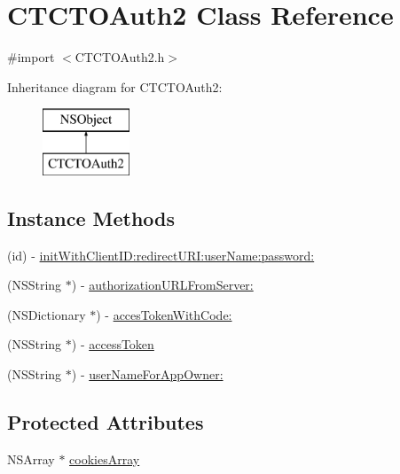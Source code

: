 \hypertarget{interface_c_t_c_t_o_auth2}{\section{C\-T\-C\-T\-O\-Auth2 Class Reference}
\label{interface_c_t_c_t_o_auth2}
}


{\ttfamily \#import $<$C\-T\-C\-T\-O\-Auth2.\-h$>$}

Inheritance diagram for C\-T\-C\-T\-O\-Auth2\-:\begin{figure}[H]
\begin{center}
\leavevmode
\includegraphics[height=2.000000cm]{interface_c_t_c_t_o_auth2}
\end{center}
\end{figure}
\subsection*{Instance Methods}
\begin{DoxyCompactItemize}
\item 
(id) -\/ \hyperlink{interface_c_t_c_t_o_auth2_a1a64c838f79fef55b95e8188231a7170}{init\-With\-Client\-I\-D\-:redirect\-U\-R\-I\-:user\-Name\-:password\-:}
\item 
(N\-S\-String $\ast$) -\/ \hyperlink{interface_c_t_c_t_o_auth2_a864691177dd38e1133e6886f49cc34a8}{authorization\-U\-R\-L\-From\-Server\-:}
\item 
(N\-S\-Dictionary $\ast$) -\/ \hyperlink{interface_c_t_c_t_o_auth2_aaa02738a263ad8efd776e3f340fa9edf}{acces\-Token\-With\-Code\-:}
\item 
(N\-S\-String $\ast$) -\/ \hyperlink{interface_c_t_c_t_o_auth2_a9c60aebf316abf0cefb44b5c2ce5379b}{access\-Token}
\item 
(N\-S\-String $\ast$) -\/ \hyperlink{interface_c_t_c_t_o_auth2_ae3cefb0d226f2d440566735db3ae0fa4}{user\-Name\-For\-App\-Owner\-:}
\end{DoxyCompactItemize}
\subsection*{Protected Attributes}
\begin{DoxyCompactItemize}
\item 
N\-S\-Array $\ast$ \hyperlink{interface_c_t_c_t_o_auth2_a756424e92592c2e597cae4abf66a5dbf}{cookies\-Array}
\end{DoxyCompactItemize}
